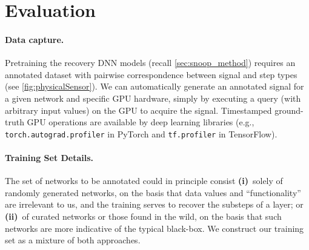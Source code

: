 \documentclass[12pt]{report}
\newcommand{\Li}{\textbf{(i)}\ }
\newcommand{\Lii}{\textbf{(ii)}\ }
\begin{document}
\section{Evaluation}\label{sec:snoop_eval}

\paragraph{Data capture.}
Pretraining the recovery DNN models (recall \ref{sec:snoop_method})
requires an annotated dataset with pairwise correspondence between signal and 
step types (see \ref{fig:physicalSensor}).
We can automatically generate an annotated signal for a given network
and specific GPU hardware, simply by executing a query (with arbitrary input values) on the 
GPU to acquire the signal. 
Timestamped ground-truth GPU operations
are available by deep learning libraries (e.g., \texttt{\small torch.autograd.profiler} in PyTorch and
\texttt{\small  tf.profiler} in TensorFlow). 


\paragraph{Training Set Details.} 
The set of networks to be annotated could in principle consist \Li solely of 
randomly generated networks, on the basis that data values and ``functionality'' are irrelevant 
to us, and the training serves to recover the substeps of a layer;
or \Lii of curated networks or those found in the wild, on the basis that such 
networks are more indicative of the typical black-box. 
We construct our training set as a mixture of both approaches.
\end{document}
